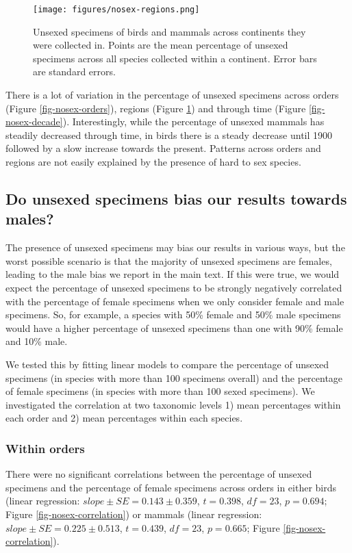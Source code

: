 \documentclass[a4paper, 12pt]{article}
\begin{document}
\begin{figure}[H]
 \centering
  \texttt{[image: figures/nosex-regions.png]}
  \caption{Unsexed specimens of birds and mammals across continents they were collected in. 
  Points are the mean percentage of unsexed specimens across all species collected within a continent. 
  Error bars are standard errors.}
  \label{fig-nosex-continent}
\end{figure}

There is a lot of variation in the percentage of unsexed specimens across orders (Figure \ref{fig-nosex-orders}), regions (Figure \ref{fig-nosex-continent}) and through time (Figure \ref{fig-nosex-decade}). 
Interestingly, while the percentage of unsexed mammals has steadily decreased through time, in birds there is a steady decrease until 1900 followed by a slow increase towards the present. 
Patterns across orders and regions are not easily explained by the presence of hard to sex species.

\subsection*{Do unsexed specimens bias our results towards males?}

The presence of unsexed specimens may bias our results in various ways, but the worst possible scenario is that the majority of unsexed specimens are females, leading to the male bias we report in the main text. 
If this were true, we would expect the percentage of unsexed specimens to be strongly negatively correlated with the percentage of female specimens when we only consider female and male specimens. 
So, for example, a species with 50\% female and 50\% male specimens would have a higher percentage of unsexed specimens than one with 90\% female and 10\% male. 

We tested this by fitting linear models to compare the percentage of unsexed specimens (in species with more than 100 specimens overall) and the percentage of female specimens (in species with more than 100 sexed specimens). 
We investigated the correlation at two taxonomic levels 1) mean percentages within each order and 2) mean percentages within each species.

\subsubsection*{Within orders}
There were no significant correlations between the percentage of unsexed specimens and the percentage of female specimens across orders in either birds (linear regression: $slope ± SE = 0.143 \pm 0.359$, $t = 0.398$, $df = 23$, $p = 0.694$; Figure \ref{fig-nosex-correlation}) or mammals (linear regression: $slope \pm SE = 0.225 \pm 0.513$, $t = 0.439$, $df = 23$, $p = 0.665$; Figure \ref{fig-nosex-correlation}). 
\end{document}
